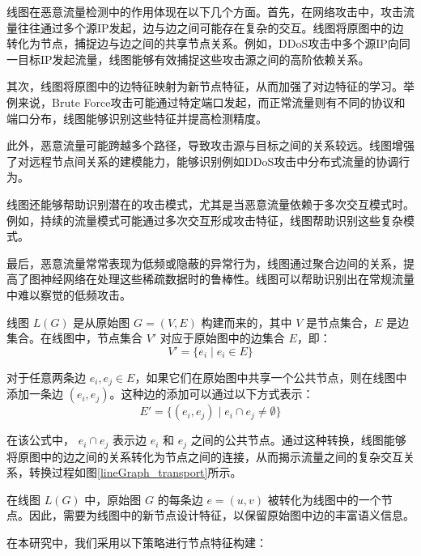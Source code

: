 \documentclass[promaster]{thesis-uestc}
\begin{document}
线图在恶意流量检测中的作用体现在以下几个方面。首先，在网络攻击中，攻击流量往往通过多个源IP发起，边与边之间可能存在复杂的交互。线图将原图中的边转化为节点，捕捉边与边之间的共享节点关系。例如，DDoS攻击中多个源IP向同一目标IP发起流量，线图能够有效捕捉这些攻击源之间的高阶依赖关系。

其次，线图将原图中的边特征映射为新节点特征，从而加强了对边特征的学习。举例来说，Brute Force攻击可能通过特定端口发起，而正常流量则有不同的协议和端口分布，线图能够识别这些特征并提高检测精度。

此外，恶意流量可能跨越多个路径，导致攻击源与目标之间的关系较远。线图增强了对远程节点间关系的建模能力，能够识别例如DDoS攻击中分布式流量的协调行为。

线图还能够帮助识别潜在的攻击模式，尤其是当恶意流量依赖于多次交互模式时。例如，持续的流量模式可能通过多次交互形成攻击特征，线图帮助识别这些复杂模式。

最后，恶意流量常常表现为低频或隐蔽的异常行为，线图通过聚合边间的关系，提高了图神经网络在处理这些稀疏数据时的鲁棒性。线图可以帮助识别出在常规流量中难以察觉的低频攻击。

线图 \( L(G) \) 是从原始图 \( G = (V, E) \) 构建而来的，其中 \( V \) 是节点集合，\( E \) 是边集合。在线图中，节点集合 \( V' \) 对应于原始图中的边集合 \( E \)，即：
\begin{equation}
V' = \{ e_i \mid e_i \in E \}
\end{equation}

对于任意两条边 \( e_i, e_j \in E \)，如果它们在原始图中共享一个公共节点，则在线图中添加一条边 \( (e_i, e_j) \)。这种边的添加可以通过以下方式表示：
\begin{equation}
E' = \{ (e_i, e_j) \mid e_i \cap e_j \neq \emptyset \}
\end{equation}

在该公式中， \( e_i \cap e_j \) 表示边 \( e_i \) 和 \( e_j \) 之间的公共节点。通过这种转换，线图能够将原图中的边之间的关系转化为节点之间的连接，从而揭示流量之间的复杂交互关系，转换过程如图\ref{lineGraph_transport}所示。

在线图 \( L(G) \) 中，原始图 \( G \) 的每条边 \( e = (u, v) \) 被转化为线图中的一个节点。因此，需要为线图中的新节点设计特征，以保留原始图中边的丰富语义信息。

在本研究中，我们采用以下策略进行节点特征构建：
\end{document}
